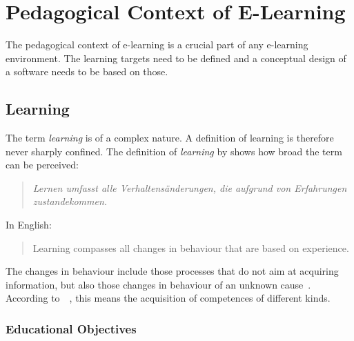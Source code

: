 \section{Pedagogical Context of E-Learning}
\label{sec:elearn:pedagogicalcontext}

The pedagogical context of e-learning is a crucial part of any e-learning
environment. The learning targets need to be defined and a conceptual design
of a software needs to be based on those.

\subsection{Learning}
\label{sec:elearn:learning}

The term \emph{learning} is of a complex nature. A definition of learning is
therefore never sharply confined. The definition of \emph{learning} by 
 \citeyear{Lefrancois1994} shows how broad
the term can be perceived:
\begin{quote}
  \emph{Lernen umfasst alle Verhaltensänderungen, 
        die aufgrund von Erfahrungen zustandekommen.}
\end{quote}
In English:
\begin{quote}
 Learning compasses all changes in behaviour that are based on experience.
\end{quote}
The changes in behaviour include those processes that do not aim at acquiring
information, but also those changes in behaviour of an unknown 
cause~. According to~~\citeyear{Richert2007},
this means the acquisition of competences of different kinds.

\subsubsection{Educational Objectives}
\label{sec:elearn:learningaims}

